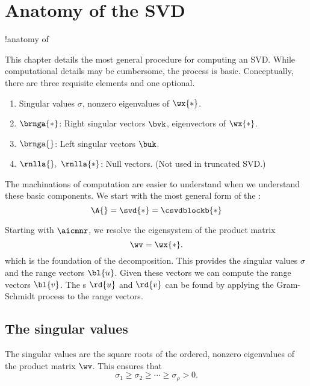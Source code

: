 \section{Anatomy of the SVD}{\asvd!anatomy of}

This chapter details the most general procedure for computing an SVD. While computational details may be cumbersome, the process is basic. Conceptually, there are three requisite elements and one optional.

\begin{enumerate}
%
  \item Singular values $\sigma$, nonzero eigenvalues of $\wx{*}$.
%
  \item $\brnga{*}$: Right singular vectors $\bvk$, eigenvectors of $\wx{*}$.
%
  \item $\brnga{}$: Left singular vectors $\buk$.
%
  \item $\rnlla{},\ \rnlla{*}$: Null vectors. (Not used in truncated SVD.)
%
\end{enumerate}
The machinations of computation are easier to understand when we understand these basic components. We start with the most general form of the \asvd:
\begin{equation}
  \A{} = \svd{*} = \csvdblockb{*}
  \label{eq:SVD:block}
\end{equation}

Starting with $\aicmnr$, we resolve the eigensystem of the product matrix
\begin{equation}
  \wv = \wx{*}.
\end{equation}
which is the foundation of the decomposition. This provides the singular values $\sigma$ and the range vectors ${\bl{ u }}$. Given these vectors we can compute the range vectors ${\bl{ v }}$. The \ns s ${\rd{ u }}$ and ${\rd{ v }}$ can be found by applying the Gram-Schmidt process to the range vectors.

\subsection{The singular values}
The singular values are the square roots of the ordered, nonzero eigenvalues of the product matrix $\wv$. This ensures that
\begin{equation}
  \sigma_{1} \ge \sigma_{2} \ge \cdots \ge \sigma_{\rho} > 0.
\end{equation}

